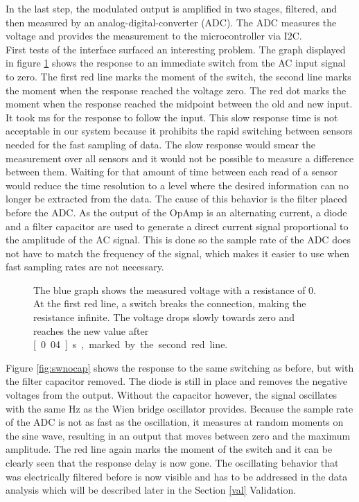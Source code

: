 In the last step, the modulated output is amplified in two stages, filtered, and then measured by an analog-digital-converter (ADC). The ADC measures the voltage and provides the measurement to the microcontroller via I2C.\\

First tests of the interface surfaced an interesting problem. The graph displayed in figure \ref{fig:swcap} shows the response to an immediate switch from the AC input signal to zero. The first red line marks the moment of the switch, the second line marks the moment when the response reached the voltage zero. The red dot marks the moment when the response reached the midpoint between the old and new input. It took \unit[40]{ms} for the response to follow the input. This slow response time is not acceptable in our system because it prohibits the rapid switching between sensors needed for the fast sampling of data. The slow response would smear the measurement over all sensors and it would not be possible to measure a difference between them. Waiting for that amount of time between each read of a sensor would reduce the time resolution to a level where the desired information can no longer be extracted from the data. The cause of this behavior is the filter placed before the ADC. As the output of the OpAmp is an alternating current, a diode and a filter capacitor are used to generate a direct current signal proportional to the amplitude of the AC signal. This is done so the sample rate of the ADC does not have to match the frequency of the signal, which makes it easier to use when fast sampling rates are not necessary.\\

\begin{figure}
	\begin{center}
		
		\caption{The blue graph shows the measured voltage with a resistance of 0. At the first red line, a switch breaks the connection, making the resistance infinite. The voltage drops slowly towards zero and reaches the new value after \unit[0.04]{s}, marked by the second red line.}
		\label{fig:swcap}
	\end{center}
\end{figure}

Figure \ref{fig:swnocap} shows the response to the same switching as before, but with the filter capacitor removed. The diode is still in place and removes the negative voltages from the output. Without the capacitor however, the signal oscillates with the same \unit[1666]{Hz} as the Wien bridge oscillator provides. Because the sample rate of the ADC is not as fast as the oscillation, it measures at random moments on the sine wave, resulting in an output that moves between zero and the maximum amplitude. The red line again marks the moment of the switch and it can be clearly seen that the response delay is now gone. The oscillating behavior that was electrically filtered before is now visible and has to be addressed in the data analysis which will be described later in the Section \ref{val} Validation.

